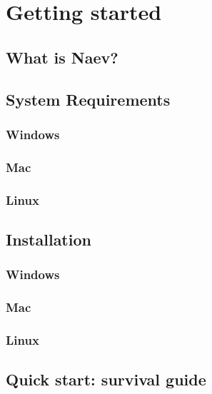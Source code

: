 \documentclass[a4paper,11pt]{article}
\begin{document}


\section{Getting started}

\subsection{What is Naev?}

\subsection{System Requirements}
\subsubsection{Windows}
\subsubsection{Mac}
\subsubsection{Linux}

\subsection{Installation}
\subsubsection{Windows}
\subsubsection{Mac}
\subsubsection{Linux}

\subsection{Quick start: survival guide}
\end{document}
